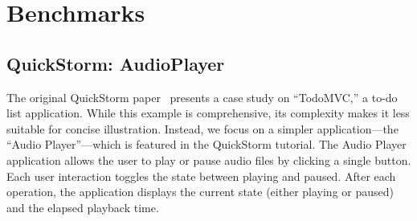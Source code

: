 \section{Benchmarks}

\subsection{QuickStorm: AudioPlayer}

The original QuickStorm paper~\cite{quickstorm} presents a case study on ``TodoMVC,'' a to-do list application. While this example is comprehensive, its complexity makes it less suitable for concise illustration. Instead, we focus on a simpler application—the ``Audio Player''—which is featured in the QuickStorm tutorial.
The Audio Player application allows the user to play or pause audio files by clicking a single button. Each user interaction toggles the state between playing and paused. After each operation, the application displays the current state (either playing or paused) and the elapsed playback time.

